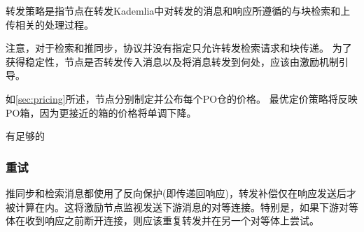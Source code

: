 转发策略是指节点在转发Kademlia中对转发的消息和响应所遵循的与块检索和上传相关的处理过程。

注意，对于检索和推同步，协议并没有指定只允许转发检索请求和块传递。
为了获得稳定性，节点是否转发传入消息以及将消息转发到何处，应该由激励机制引导。

如\ref{sec:pricing}所述，节点分别制定并公布每个PO仓的价格。 
最优定价策略将反映PO箱，因为更接近的箱的价格将单调下降。 

有足够的 
    
 
\subsubsection{重试}

推同步和检索消息都使用了反向保护(即传递回响应)，转发补偿仅在响应发送后才被计算在内。这将激励节点监视发送下游消息的对等连接。特别是，如果下游对等体在收到响应之前断开连接，则应该重复转发并在另一个对等体上尝试。








